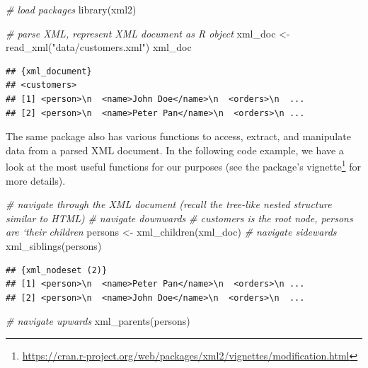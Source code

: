 \documentclass[
  12pt,
]{style/krantz}
\newenvironment{Shaded}{\begin{snugshade}}{\end{snugshade}}
\newcommand{\CommentTok}[1]{\textcolor[rgb]{0.56,0.35,0.01}{\textit{#1}}}
\newcommand{\FunctionTok}[1]{\textcolor[rgb]{0.00,0.00,0.00}{#1}}
\newcommand{\NormalTok}[1]{#1}
\newcommand{\OtherTok}[1]{\textcolor[rgb]{0.56,0.35,0.01}{#1}}
\newcommand{\StringTok}[1]{\textcolor[rgb]{0.31,0.60,0.02}{#1}}
\renewcommand{\href}[2]{#2\footnote{\url{#1}}}
\begin{document}
\begin{Shaded}
\begin{Highlighting}[]
\CommentTok{\# load packages}
\FunctionTok{library}\NormalTok{(xml2)}

\CommentTok{\# parse XML, represent XML document as R object}
\NormalTok{xml\_doc }\OtherTok{\textless{}{-}} \FunctionTok{read\_xml}\NormalTok{(}\StringTok{"data/customers.xml"}\NormalTok{)}
\NormalTok{xml\_doc}
\end{Highlighting}
\end{Shaded}

\begin{verbatim}
## {xml_document}
## <customers>
## [1] <person>\n  <name>John Doe</name>\n  <orders>\n  ...
## [2] <person>\n  <name>Peter Pan</name>\n  <orders>\n ...
\end{verbatim}

The same package also has various functions to access, extract, and manipulate data from a parsed XML document. In the following code example, we have a look at the most useful functions for our purposes (see the package's \href{https://cran.r-project.org/web/packages/xml2/vignettes/modification.html}{vignette} for more details).

\begin{Shaded}
\begin{Highlighting}[]
\CommentTok{\# navigate through the XML document (recall the tree{-}like nested structure similar to HTML)}
\CommentTok{\# navigate downwards}
\CommentTok{\# \textquotesingle{}customers\textquotesingle{} is the root node, persons are ‘their children\textquotesingle{}}
\NormalTok{persons }\OtherTok{\textless{}{-}} \FunctionTok{xml\_children}\NormalTok{(xml\_doc)}
\CommentTok{\# navigate sidewards}
\FunctionTok{xml\_siblings}\NormalTok{(persons)}
\end{Highlighting}
\end{Shaded}

\begin{verbatim}
## {xml_nodeset (2)}
## [1] <person>\n  <name>Peter Pan</name>\n  <orders>\n ...
## [2] <person>\n  <name>John Doe</name>\n  <orders>\n  ...
\end{verbatim}

\begin{Shaded}
\begin{Highlighting}[]
\CommentTok{\# navigate upwards}
\FunctionTok{xml\_parents}\NormalTok{(persons)}
\end{Highlighting}
\end{Shaded}
\end{document}
